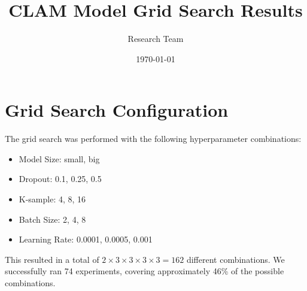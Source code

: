 \documentclass{article}
\title{CLAM Model Grid Search Results}
\author{Research Team}
\date{\today}
\begin{document}
\maketitle

\section{Grid Search Configuration}
The grid search was performed with the following hyperparameter combinations:

\begin{itemize}
    \item Model Size: small, big
    \item Dropout: 0.1, 0.25, 0.5
    \item K-sample: 4, 8, 16
    \item Batch Size: 2, 4, 8
    \item Learning Rate: 0.0001, 0.0005, 0.001
\end{itemize}

This resulted in a total of $2 \times 3 \times 3 \times 3 \times 3 = 162$ different combinations. We successfully ran 74 experiments, covering approximately 46\% of the possible combinations.
\end{document}
